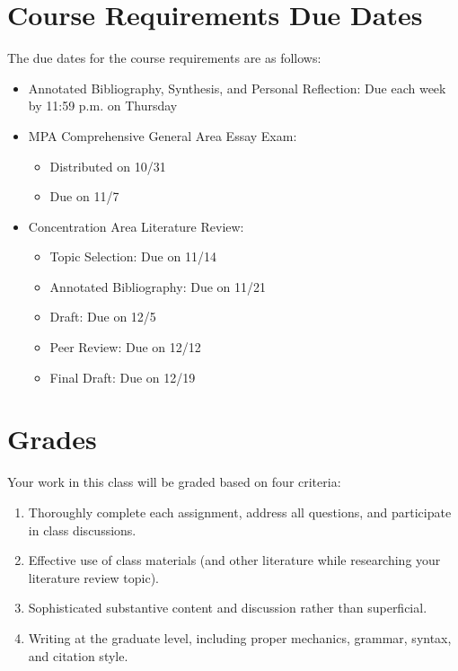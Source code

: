 \documentclass[12pt, letterpaper]{article}
\begin{document}
\section{Course Requirements Due Dates}

The due dates for the course requirements are as follows:
    \begin{itemize}
        \item Annotated Bibliography, Synthesis, and Personal Reflection: Due each week by 11:59 p.m. on Thursday
        \item MPA Comprehensive General Area Essay Exam:
        \begin{itemize}
            \item Distributed on 10/31
            \item Due on 11/7
        \end{itemize}
        \item Concentration Area Literature Review:
        \begin{itemize}
            \item Topic Selection: Due on 11/14
            \item Annotated Bibliography: Due on 11/21
            \item Draft: Due on 12/5
            \item Peer Review: Due on 12/12
            \item Final Draft: Due on 12/19
        \end{itemize}
    \end{itemize}

\section{Grades}

Your work in this class will be graded based on four criteria:
    \begin{enumerate}
        \item Thoroughly complete each assignment, address all questions, and participate in class discussions.
        \item Effective use of class materials (and other literature while researching your literature review topic).
        \item Sophisticated substantive content and discussion rather than superficial.
        \item Writing at the graduate level, including proper mechanics, grammar, syntax, and citation style.
    \end{enumerate}
\end{document}
